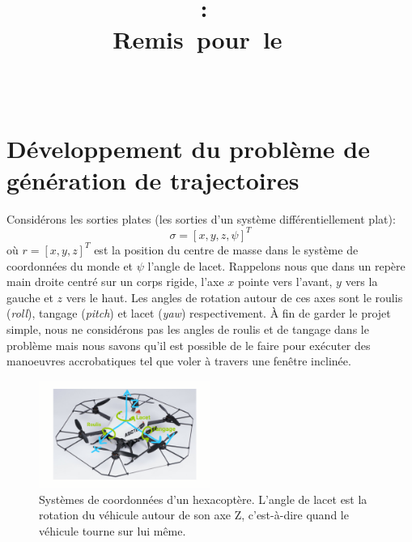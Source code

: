 \documentclass{article}
\title{
    \vspace{2in}
    \textmd{\textbf{\hmwkClass:\ \hmwkTitle}}\\
    \normalsize\vspace{0.1in}\small{Remis\ pour\ le\ \hmwkDueDate\ }\\
    \vspace{0.1in}\large{\textit{\hmwkClassInstructor\ \hmwkClassTime}}
    \vspace{3in}
}
\author{\textbf{\hmwkAuthorName}}
\date{}
\begin{document}
\maketitle

\pagebreak


\section{Développement du problème de génération de trajectoires}
Considérons les sorties plates (les sorties d'un système différentiellement plat):
\begin{equation}
\sigma = [x, y, z, \psi]^T
\end{equation}
où $r = [x, y, z]^T$ est la position du centre de masse dans le système de coordonnées du monde et $\psi$ l'angle de lacet. Rappelons nous que dans un repère main droite centré sur un corps rigide, l'axe $x$ pointe vers l'avant, $y$ vers la gauche et $z$ vers le haut. Les angles de rotation autour de ces axes sont le roulis (\textit{roll}), tangage (\textit{pitch}) et lacet (\textit{yaw}) respectivement. À fin de garder le projet simple, nous ne considérons pas les angles de roulis et de tangage dans le problème mais nous savons qu'il est possible de le faire pour exécuter des manoeuvres accrobatiques tel que voler à travers une fenêtre inclinée.

\begin{figure}[h]
	\centering
	\includegraphics[width=0.5\textwidth]{fig/firefly.png}
	\caption{Systèmes de coordonnées d'un hexacoptère. L'angle de lacet est la rotation du véhicule autour de son axe Z, c'est-à-dire quand le véhicule tourne sur lui même.}
\end{figure}
\end{document}
